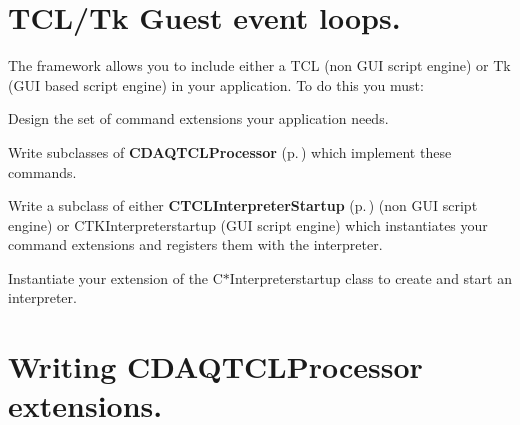 \section{TCL/Tk Guest event loops.}\label{TCLGuests}


The framework allows you to include either a TCL (non GUI script engine) or Tk (GUI based script engine) in your application. To do this you must:\begin{CompactItemize}
\item 
Design the set of command extensions your application needs.\item 
Write subclasses of {\bf CDAQTCLProcessor} {\rm (p.\,\pageref{classCDAQTCLProcessor})} which implement these commands.\item 
Write a subclass of either {\bf CTCLInterpreter\-Startup} {\rm (p.\,\pageref{classCTCLInterpreterStartup})} (non GUI script engine) or CTKInterpreterstartup (GUI script engine) which instantiates your command extensions and registers them with the interpreter.\item 
Instantiate your extension of the C$\ast$Interpreterstartup class to create and start an interpreter.\end{CompactItemize}
\section{Writing CDAQTCLProcessor extensions.}\label{TclCommandProcessors}


